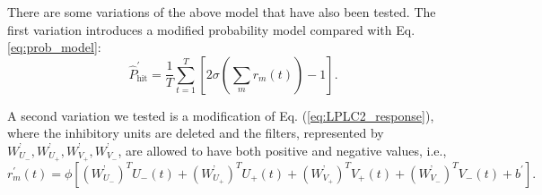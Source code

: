 \documentclass[pdftex,9pt,lineno]{elife}
\newcommand{\mc}{\mathcal}
\newcommand{\mb}{\mathbb}
\newcommand{\sigmoid}{\text{sigmoid}}
\newcommand{\relu}{\text{\small\sc ReLU}}
\let\hat\widehat
\DeclareMathOperator*{\trace}{tr}
\begin{document}
There are some variations of the above model that have also been tested. The first variation introduces a modified probability model compared with Eq. \ref{eq:prob_model}:
\begin{equation}
\hat{P}^{'}_{\text{hit}} = \frac{1}{T}\sum_{t=1}^{T}\left[ 2\sigma \left( \sum_{m}r_{m}(t) \right)-1 \right].
\label{eq:prob_model2}
\end{equation}

A second variation we tested is a modification of Eq. (\ref{eq:LPLC2_response}), where the inhibitory units are deleted and the filters, represented by $W^{\text{'}}_{U_{-}},W^{\text{'}}_{U_{+}},W^{\text{'}}_{V_{+}},W^{\text{'}}_{V_{-}}$, are allowed to have both positive and negative values, i.e.,
\begin{equation}
r_{m}^{'}(t) = \phi \left[ (W^{\text{'}}_{U_{-}})^{T}U_{-}(t)+(W^{\text{'}}_{U_{+}})^{T}U_{+}(t)+(W^{\text{'}}_{V_{+}})^{T}V_{+}(t)+(W^{\text{'}}_{V_{-}})^{T}V_{-}(t)+b^{'} \right].
\label{eq:LPLC2_response_2}
\end{equation}





\end{document}
